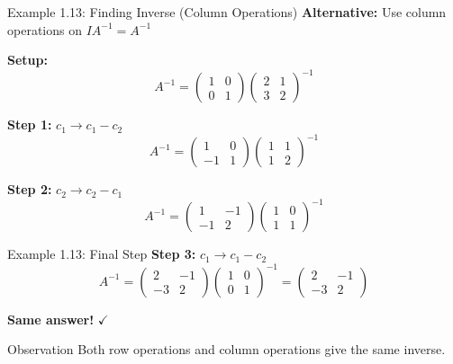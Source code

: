\documentclass[10pt]{beamer}
\theoremstyle{definition}
\begin{document}
\begin{frame}{Example 1.13: Finding Inverse (Column Operations)}
\textbf{Alternative:} Use column operations on $IA^{-1} = A^{-1}$

\textbf{Setup:}
$$A^{-1} = \begin{pmatrix} 1 & 0 \\ 0 & 1 \end{pmatrix} \begin{pmatrix} 2 & 1 \\ 3 & 2 \end{pmatrix}^{-1}$$

\textbf{Step 1:} $c_1 \to c_1 - c_2$
$$A^{-1} = \begin{pmatrix} 1 & 0 \\ -1 & 1 \end{pmatrix} \begin{pmatrix} 1 & 1 \\ 1 & 2 \end{pmatrix}^{-1}$$

\textbf{Step 2:} $c_2 \to c_2 - c_1$
$$A^{-1} = \begin{pmatrix} 1 & -1 \\ -1 & 2 \end{pmatrix} \begin{pmatrix} 1 & 0 \\ 1 & 1 \end{pmatrix}^{-1}$$
\end{frame}

\begin{frame}{Example 1.13: Final Step}
\textbf{Step 3:} $c_1 \to c_1 - c_2$
$$A^{-1} = \begin{pmatrix} 2 & -1 \\ -3 & 2 \end{pmatrix} \begin{pmatrix} 1 & 0 \\ 0 & 1 \end{pmatrix}^{-1} = \begin{pmatrix} 2 & -1 \\ -3 & 2 \end{pmatrix}$$

\vspace{0.5cm}
\begin{center}
\Large \textbf{Same answer!} $\checkmark$
\end{center}

\vspace{0.3cm}
\begin{block}{Observation}
Both row operations and column operations give the same inverse.
\end{block}
\end{frame}
\end{document}
